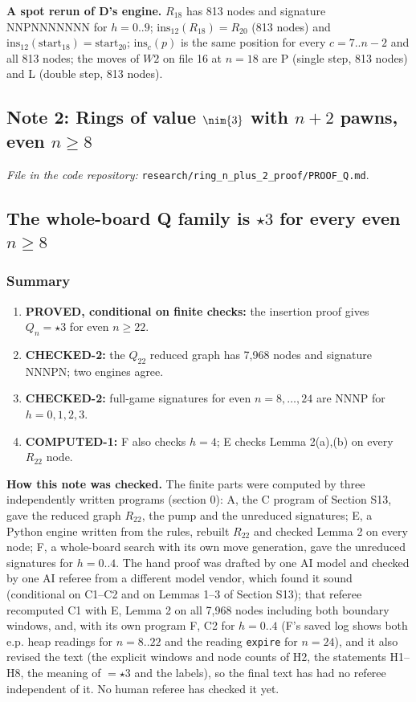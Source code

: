 \textbf{A spot rerun of D's engine.} $R_{18}$ has 813 nodes and signature NNPNNNNNNN for $h=0..9$; $\mathrm{ins}_{12}(R_{18})=R_{20}$ (813 nodes) and $\mathrm{ins}_{12}(\mathrm{start}_{18})=\mathrm{start}_{20}$; $\mathrm{ins}_c(p)$ is the same position for every $c=7..n-2$ and all 813 nodes; the moves of $W2$ on file 16 at $n=18$ are P (single step, 813 nodes) and L (double step, 813 nodes).


\subsection{Note 2: Rings of value $\nim{3}$ with $n+2$ pawns, even $n\ge8$}

\noindent\emph{File in the code repository:} \texttt{research/ring\_n\_plus\_2\_proof/PROOF\_Q.md}.\par


\subsection*{The whole-board Q family is $\star3$ for every even $n\ge8$}
\subsubsection*{Summary}
\begin{enumerate}
\item \textbf{PROVED, conditional on finite checks:} the insertion proof gives $Q_n=\star3$ for even $n\ge22$.
\item \textbf{CHECKED-2:} the $Q_{22}$ reduced graph has 7,968 nodes and signature NNNPN; two engines agree.
\item \textbf{CHECKED-2:} full-game signatures for even $n=8,\ldots,24$ are NNNP for $h=0,1,2,3$.
\item \textbf{COMPUTED-1:} F also checks $h=4$; E checks Lemma 2(a),(b) on every $R_{22}$ node.
\end{enumerate}
\textbf{How this note was checked.} The finite parts were computed by three independently written programs (section 0): A, the C program of Section S13, gave the reduced graph $R_{22}$, the pump and the unreduced signatures; E, a Python engine written from the rules, rebuilt $R_{22}$ and checked Lemma 2 on every node; F, a whole-board search with its own move generation, gave the unreduced signatures for $h=0..4$. The hand proof was drafted by one AI model and checked by one AI referee from a different model vendor, which found it sound (conditional on C1–C2 and on Lemmas 1–3 of Section S13); that referee recomputed C1 with E, Lemma 2 on all 7,968 nodes including both boundary windows, and, with its own program F, C2 for $h=0..4$ (F's saved log shows both e.p. heap readings for $n=8..22$ and the reading \texttt{expire} for $n=24$), and it also revised the text (the explicit windows and node counts of H2, the statements H1–H8, the meaning of $=\star3$ and the labels), so the final text has had no referee independent of it. No human referee has checked it yet.


